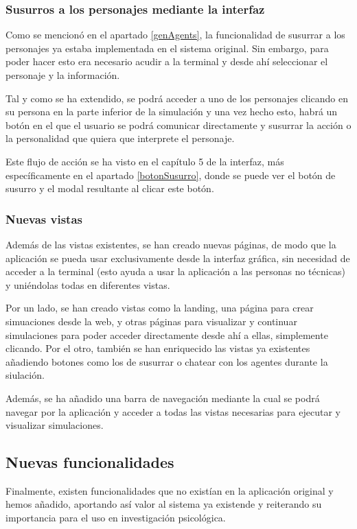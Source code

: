 \subsubsection{Susurros a los personajes mediante la interfaz}
Como se mencionó en el apartado \ref{genAgents}, la funcionalidad de susurrar a los personajes ya estaba implementada en el sistema original. Sin embargo, para poder hacer esto era necesario acudir a la terminal y desde ahí seleccionar el personaje y la información. 

Tal y como se ha extendido, se podrá acceder a uno de los personajes clicando en su persona en la parte inferior de la simulación y una vez hecho esto, habrá un botón en el que el usuario se podrá comunicar directamente y susurrar la acción o la personalidad que quiera que interprete el personaje.

Este flujo de acción se ha visto en el capítulo 5 de la interfaz, más específicamente en el apartado  \ref{botonSusurro}, donde se puede ver el botón de susurro y el modal resultante al clicar este botón.

\subsubsection{Nuevas vistas}
Además de las vistas existentes, se han creado nuevas páginas, de modo que la aplicación se pueda usar exclusivamente desde la interfaz gráfica, sin necesidad de acceder a la terminal (esto ayuda a usar la aplicación a las personas no técnicas) y uniéndolas todas en diferentes vistas.

Por un lado, se han creado vistas como la landing, una página para crear simuaciones desde la web, y otras páginas para visualizar y continuar simulaciones para poder acceder directamente desde ahí a ellas, simplemente clicando. Por el otro, también se han enriquecido las vistas ya existentes añadiendo botones como los de susurrar o chatear con los agentes durante la siulación.

Además, se ha añadido una barra de navegación mediante la cual se podrá navegar por la aplicación y acceder a todas las vistas necesarias para ejecutar y visualizar simulaciones.

\subsection{Nuevas funcionalidades}
Finalmente, existen funcionalidades que no existían en la aplicación original y hemos añadido, aportando así valor al sistema ya existende y reiterando su importancia para el uso en investigación psicológica.

